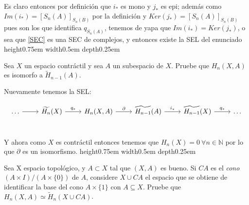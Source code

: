 \documentclass[11pt,a4paper,oneside]{article}
\newcommand{\R}{{\mathbb{R}}}
\newcommand{\N}{{\mathbb{N}}}
\newcommand{\Q}{\mathbb{Q}}
\newenvironment{proof}[1][Demostraci\'on]{\begin{trivlist}
\item[\hskip \labelsep {\bfseries #1}]}{\end{trivlist}}
\newcommand{\qed}{\nobreak \ifvmode \relax \else
      \ifdim\lastskip<1.5em \hskip-\lastskip
      \hskip1.5em plus0em minus0.5em \fi \nobreak
      \vrule height0.75em width0.5em depth0.25em\fi}
\begin{document}
\begin{enumerate}
\begin{proof}
Es claro entonces por definici\'on que $i_*$ es mono y $j_*$ es epi; adem\'as como $Im(i_*) = [S_n(A)]_{S_n(B)}$ por la definici\'on y $Ker(j_*)=[S_n(A)]_{S_n(B)}$ pues son los que identifica $q_{S_n(A)}$, tenemos de yapa que $Im(i_*) = Ker(j_*)$, o sea que \ref{SEC} es una SEC de complejos, y entonces existe la SEL del enunciado \qed

\end{proof}










\item Sea $X$ un espacio contr\'actil y sea $A$ un subespacio de $X$. Pruebe que
$H_n(X,A)$ es isomorfo a $\tilde H_{n-1}(A)$.

\begin{proof}

Nuevamente tenemos la SEL:

\[
\begin{tikzcd}
\dots \rar & \widetilde{H_n}(X) \arrow{r}{q_*} & H_n(X,A) \arrow{r}{\partial} & \widetilde{H_{n-1}}(A) \arrow{r}{i_*} & \widetilde{H_{n-1}}(X) \arrow{r}{q_*} & \dots \\
\end{tikzcd}
\]

Y ahora como $X$ es contr\'actil entonces tenemos que $H_n(X) = 0 \ \forall n \in \N$ por lo que $\partial$ es un isomorfismo. \qed 

\end{proof}

\item Sea X espacio topol\'ogico, y $A \subset X$ tal que $(X,A)$ es bueno. Si $CA$ es el \textit{cono} $(A\times I)/(A\times \{0\})$
de $A$, considere $X\cup CA$ el espacio que se obtiene de identificar la base del cono $A\times \{1\}$ con $A\subseteq X$. Pruebe que $H_n(X,A)\simeq \tilde H_n(X\cup CA)$.


\end{enumerate}
\end{document}
